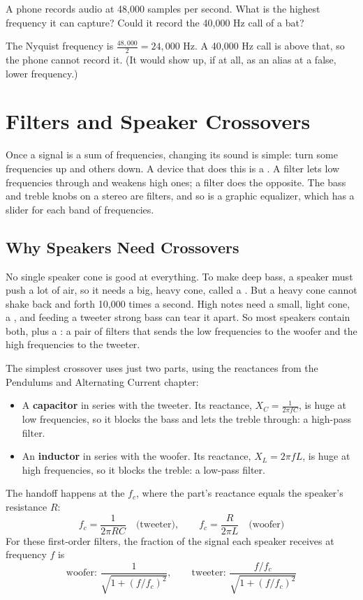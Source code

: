 \begin{Exercise}[title={Sampling Rates}, label=fs_nyq]
A phone records audio at 48,000 samples per second. What is the highest frequency it
can capture? Could it record the 40,000 Hz call of a bat?
\end{Exercise}
\begin{Answer}[ref=fs_nyq]
The Nyquist frequency is $\frac{48{,}000}{2} = 24{,}000$ Hz. A 40,000 Hz call is above
that, so the phone cannot record it. (It would show up, if at all, as an alias at a
false, lower frequency.)
\end{Answer}

\section{Filters and Speaker Crossovers}
Once a signal is a sum of frequencies, changing its sound is simple: turn some
frequencies up and others down. A device that does this is a . A
 filter lets low frequencies through and weakens high ones; a
 filter does the opposite. The bass and treble knobs on a stereo
are filters, and so is a graphic equalizer, which has a slider for each band of
frequencies.

\subsection{Why Speakers Need Crossovers}
No single speaker cone is good at everything. To make deep bass, a speaker must
push a lot of air, so it needs a big, heavy cone, called a . But a heavy
cone cannot shake back and forth 10,000 times a second. High notes need a small, light
cone, a , and feeding a tweeter strong bass can tear it apart. So most
speakers contain both, plus a : a pair of filters that sends the
low frequencies to the woofer and the high frequencies to the tweeter.

The simplest crossover uses just two parts, using the reactances from the Pendulums
and Alternating Current chapter:
\begin{itemize}
\item A \textbf{capacitor} in series with the tweeter. Its reactance,
$X_C = \frac{1}{2\pi fC}$, is huge at low frequencies, so it blocks the bass and lets
the treble through: a high-pass filter.
\item An \textbf{inductor} in series with the woofer. Its reactance, $X_L = 2\pi fL$, is
huge at high frequencies, so it blocks the treble: a low-pass filter.
\end{itemize}
The handoff happens at the  $f_c$, where the part's
reactance equals the speaker's resistance $R$:
$$f_c = \frac{1}{2\pi RC} \quad\text{(tweeter)}, \qquad f_c = \frac{R}{2\pi L} \quad\text{(woofer)}$$
For these first-order filters, the fraction of the signal each speaker receives at
frequency $f$ is
$$\text{woofer: } \frac{1}{\sqrt{1 + (f/f_c)^2}}, \qquad \text{tweeter: } \frac{f/f_c}{\sqrt{1 + (f/f_c)^2}}$$

